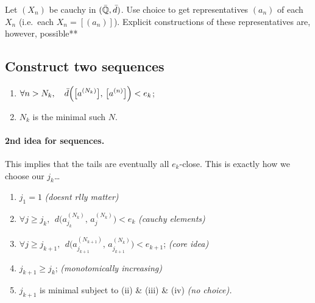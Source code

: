

Let $(X_n)$ be cauchy in $(\bar{\mathbb{Q}},\bar{d})$. Use choice to get representatives
$(a_n)$ of each $X_n$ (i.e.\ each $X_n = [(a_n)]$). Explicit constructions of
these representatives are, however, possible**


\subsection{Construct two sequences}

\begin{enumerate}[nosep,leftmargin=3em,itemsep=4pt]
    \item[(i)] $\displaystyle \forall n > N_k,\quad
        \bar{d}\Big(\big[a^{(N_k)}\big],\,\big[a^{(n)}\big]\Big) < e_k$;
    \item[(ii)] $N_k$ is the minimal such $N$.
\end{enumerate}

\paragraph{2nd idea for sequences.}
This implies that the tails are eventually all $e_k$-close.
This is exactly how we choose our $j_k$\dots

\begin{enumerate}[nosep,leftmargin=3em,itemsep=4pt]
    \item[(i)] $j_1 = 1$
        \hfill \textit{(doesnt rlly matter)}
    \item[(ii)] $\forall j \geq j_k,\ \ d\big(a_{j_k}^{(N_k)},\,a_{j}^{(N_k)}\big) < e_k$
        \hfill \textit{(cauchy elements)}
    \item[(iii)] $\displaystyle \forall j \ge j_{k+1},\ \
        d\Big(a^{(N_{k+1})}_{j_{k+1}},\, a^{(N_k)}_{j_{k+1}}\Big) < e_{k+1}$;
        \hfill \textit{(core idea)}
    \item[(iv)] $j_{k+1} \ge j_k$;
        \hfill \textit{(monotomically increasing)}
    \item[(v)] $j_{k+1}$ is minimal subject to (ii) \& (iii) \& (iv)
        \hfill \textit{(no choice).}
\end{enumerate}

